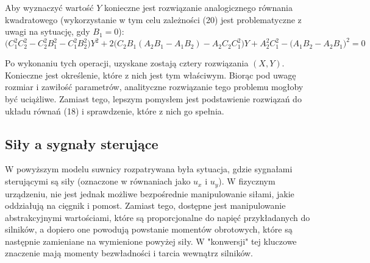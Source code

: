 \documentclass[10pt]{article}
\begin{document}
\newpage
Aby wyznaczyć wartość $Y$ konieczne jest rozwiązanie analogicznego równania kwadratowego (wykorzystanie w tym celu zależności (20) jest problematyczne z uwagi na sytuację, gdy $B_1 = 0$):
\begin{equation}
\big(C_1^2 C_2^2 - C_2^2 B_1^2 - C_1^2 B_2^2 \big) Y^2 + 
2\big(C_2B_1 (A_2B_1 - A_1B_2) - A_2C_2C_1^2 \big) Y +
A_2^2 C_1^2 - \big(A_1B_2 - A_2B_1 \big)^2
 = 0
\end{equation}

Po wykonaniu tych operacji, uzyskane zostają cztery rozwiązania $(X,Y)$. Konieczne jest określenie, które z nich jest tym właściwym. Biorąc pod uwagę rozmiar i zawiłość parametrów, analityczne rozwiązanie tego problemu mogłoby być uciążliwe. Zamiast tego, lepszym pomysłem jest podstawienie rozwiązań do układu równań (18) i sprawdzenie, które z nich go spełnia.

\subsection*{Siły a sygnały sterujące}
W powyższym modelu suwnicy rozpatrywana była sytuacja, gdzie sygnałami sterującymi są siły (oznaczone w równaniach jako $u_x$ i $u_y$). W fizycznym urządzeniu, nie jest jednak możliwe bezpośrednie manipulowanie siłami, jakie oddziałują na cięgnik i pomost. Zamiast tego, dostępne jest manipulowanie abstrakcyjnymi wartościami, które są proporcjonalne do napięć przykładanych do silników, a dopiero one powodują powstanie momentów obrotowych, które są następnie zamieniane na wymienione powyżej siły. W "konwersji" tej kluczowe znaczenie mają momenty bezwładności i tarcia wewnątrz silników. 
\end{document}
